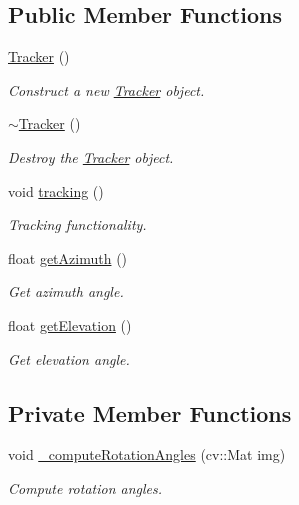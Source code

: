 \subsection*{Public Member Functions}
\begin{DoxyCompactItemize}
\item 
\hyperlink{class_tracker_adf214393a14e8bf23de2fc8231e239ec}{Tracker} ()
\begin{DoxyCompactList}\small\item\em Construct a new \hyperlink{class_tracker}{Tracker} object. \end{DoxyCompactList}\item 
\hyperlink{class_tracker_a0ed1e23312cfe7fcfe5f2ac2abd69163}{$\sim$\+Tracker} ()
\begin{DoxyCompactList}\small\item\em Destroy the \hyperlink{class_tracker}{Tracker} object. \end{DoxyCompactList}\item 
void \hyperlink{class_tracker_acef915ffe13cd44ca398e78a8ffae63e}{tracking} ()
\begin{DoxyCompactList}\small\item\em Tracking functionality. \end{DoxyCompactList}\item 
float \hyperlink{class_tracker_ab764ba74f2cd49081f5054b8496e73e2}{get\+Azimuth} ()
\begin{DoxyCompactList}\small\item\em Get azimuth angle. \end{DoxyCompactList}\item 
float \hyperlink{class_tracker_a093248f73573ee7ebb4099954d950de9}{get\+Elevation} ()
\begin{DoxyCompactList}\small\item\em Get elevation angle. \end{DoxyCompactList}\end{DoxyCompactItemize}
\subsection*{Private Member Functions}
\begin{DoxyCompactItemize}
\item 
void \hyperlink{class_tracker_af6646cbba34dd68025f980a0c5338750}{\+\_\+compute\+Rotation\+Angles} (cv\+::\+Mat img)
\begin{DoxyCompactList}\small\item\em Compute rotation angles. \end{DoxyCompactList}\end{DoxyCompactItemize}
